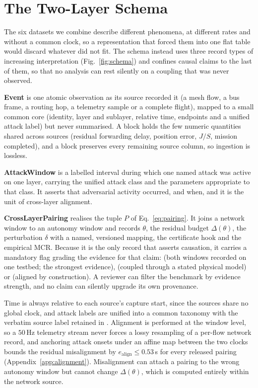 \section{The Two-Layer Schema}
\label{sec:schema}
The six datasets we combine describe different phenomena, at different rates
and without a common clock, so a representation that forced them into one flat
table would discard whatever did not fit. The schema instead uses three record
types of increasing interpretation (Fig.~\ref{fig:schema}) and confines causal
claims to the last of them, so that no analysis can rest silently on a coupling
that was never observed.

\textbf{Event} is one atomic observation as its source recorded it (a mesh
flow, a bus frame, a routing hop, a telemetry sample or a complete flight),
mapped to a small common core (identity, layer and sublayer, relative time,
endpoints and a unified attack label) but never summarised. A 
block holds the few numeric quantities shared across sources (residual
forwarding delay, position error, $J/S$, mission completed), and a
 block preserves every remaining source column, so ingestion is
lossless.

\textbf{AttackWindow} is a labelled interval during which one named attack was
active on one layer, carrying the unified attack class and the
 parameters appropriate to that class. It asserts that
adversarial activity occurred, and when, and it is the unit of cross-layer
alignment.

\textbf{CrossLayerPairing} realises the tuple $P$ of Eq.~\eqref{eq:pairing}. It
joins a network window to an autonomy window and records $\theta$, the residual
budget $\Delta(\theta)$, the perturbation $\delta$ with a named, versioned
mapping, the certificate hook and the empirical MCR. Because it is the only
record that asserts causation, it carries a mandatory 
flag grading the evidence for that claim:  (both
windows recorded on one testbed; the strongest evidence), 
(coupled through a stated physical model) or 
(aligned by construction). A reviewer can filter the benchmark by evidence
strength, and no claim can silently upgrade its own provenance.

Time is always relative to each source's capture start, since the sources share
no global clock, and attack labels are unified into a common taxonomy with the
verbatim source label retained in . Alignment is performed
at the window level, so a $50$\,Hz telemetry stream never forces a lossy
resampling of a per-flow network record, and anchoring attack onsets under an
affine map between the two clocks bounds the residual misalignment by
$e_{\mathrm{align}}\le0.53$\,s for every released pairing
(Appendix~\ref{app:alignment}). Misalignment can attach a pairing to the wrong
autonomy window but cannot change $\Delta(\theta)$, which is computed entirely
within the network source.

